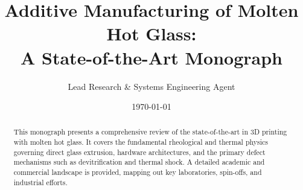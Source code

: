 \documentclass[10pt,twocolumn,letterpaper]{article}
\title{Additive Manufacturing of Molten Hot Glass: \\A State-of-the-Art Monograph}
\author{Lead Research \& Systems Engineering Agent}
\date{\today}
\begin{document}
\maketitle

\begin{abstract}
This monograph presents a comprehensive review of the state-of-the-art in 3D printing with molten hot glass. It covers the fundamental rheological and thermal physics governing direct glass extrusion, hardware architectures, and the primary defect mechanisms such as devitrification and thermal shock. A detailed academic and commercial landscape is provided, mapping out key laboratories, spin-offs, and industrial efforts.
\end{abstract}












\end{document}
